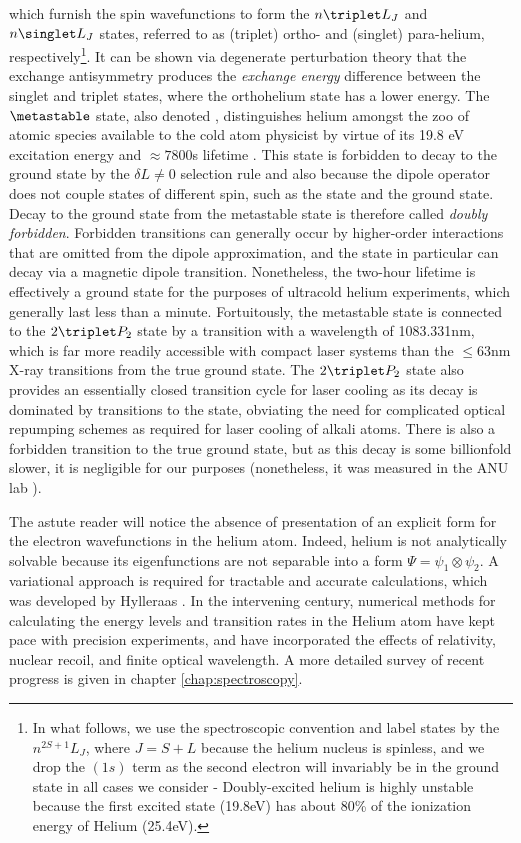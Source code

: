 	which furnish the spin wavefunctions to form the $n\triplet L_{J}$ and $n\singlet L_{J}$ states, referred to as (triplet) ortho- and (singlet) para-helium, respectively\footnote{In what follows, we use the spectroscopic convention and label states by the $n^{2S+1}L_J$, where $J=S+L$ because the helium nucleus is spinless, and we drop the $(1s)$ term as the second electron will invariably be in the ground state in all cases we consider -  Doubly-excited helium is highly unstable because the first excited state (19.8eV) has about 80\% of the ionization energy of Helium (25.4eV).}.
	It can be shown via degenerate perturbation theory that the exchange antisymmetry produces the \emph{exchange energy} difference between the singlet and triplet states, where the  orthohelium state has a lower energy.
	 The $\metastable$ state, also denoted \mhe, distinguishes helium amongst the zoo of atomic species available to the cold atom physicist by virtue of its 19.8 eV excitation energy and $\approx 7800$s lifetime \cite{Hodgman09_mhe}.
	 This state is forbidden to decay to the ground state by the $\delta L\neq0$ selection rule and also because the dipole operator does not couple states of different spin, such as the \mhe state and the ground state.
	Decay to the ground state from the metastable state is  therefore called \emph{doubly forbidden}.
	Forbidden transitions can generally occur by higher-order interactions that are omitted from the dipole approximation, and the \mhe state in particular can decay via a magnetic dipole transition.
	Nonetheless, the two-hour lifetime is effectively a ground state for the purposes of ultracold helium experiments, which generally last less than a minute.
	Fortuitously, the metastable state is connected to the $2\triplet P_2$ state by a transition with a wavelength of 1083.331nm, which is far more readily accessible with compact laser systems than the $\leq 63$nm X-ray transitions from the true ground state.
	The $2\triplet P_2$ state also provides an essentially closed transition cycle for laser cooling as its decay is dominated by transitions to the \mhe state, obviating the need for complicated optical repumping schemes as required for laser cooling of alkali atoms.
	There is also a forbidden transition to the true ground state, but as this decay is some billionfold slower, it is negligible for our purposes (nonetheless, it was measured in the ANU lab \cite{Hodgman09_23P}).

	The astute reader will notice the absence of presentation of an explicit form for the electron wavefunctions in the helium atom.
	Indeed,	helium is not analytically solvable because its eigenfunctions are not separable into a form $\Psi = \psi_1\otimes\psi_2$.
	A variational approach is required for tractable and accurate calculations, which was developed by Hylleraas \cite{Hylleraas1920,Hylleraas1929,Hylleraas1930}.
	In the intervening century, numerical methods for calculating the energy levels and transition rates in the Helium atom have kept pace with precision experiments, and have incorporated the effects of relativity, nuclear recoil, and finite optical wavelength. A more detailed survey of recent progress is given in chapter \ref{chap:spectroscopy}.

